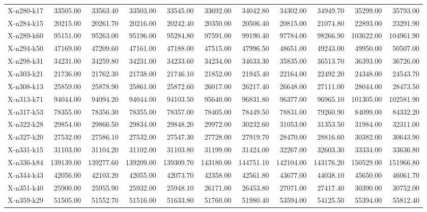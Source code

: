 \documentclass[letterpaper]{article} %
\begin{document}
\begin{landscape}
\begin{longtable}{@{}l rr rr rr rr rr@{}}
X-n280-k17 & 33505.00 & 33563.40 & 33503.00 & 33545.00 & 33692.00 & 34042.80 & 34302.00 & 34949.70 & 35299.00 & 35793.00 \\
X-n284-k15 & 20215.00 & 20261.70 & 20216.00 & 20242.40 & 20350.00 & 20506.40 & 20815.00 & 21074.80 & 22893.00 & 23291.90 \\
X-n289-k60 & 95151.00 & 95263.00 & 95196.00 & 95284.80 & 97591.00 & 99190.40 & 97784.00 & 98266.90 & 103622.00 & 104961.90 \\
X-n294-k50 & 47169.00 & 47209.60 & 47161.00 & 47188.00 & 47515.00 & 47996.50 & 48651.00 & 49243.00 & 49950.00 & 50507.00 \\
X-n298-k31 & 34231.00 & 34259.80 & 34231.00 & 34233.60 & 34234.00 & 34633.30 & 35835.00 & 36513.70 & 36393.00 & 36726.00 \\
X-n303-k21 & 21736.00 & 21762.30 & 21738.00 & 21746.10 & 21852.00 & 21945.40 & 22164.00 & 22492.20 & 24348.00 & 24543.70 \\
X-n308-k13 & 25859.00 & 25878.90 & 25861.00 & 25872.60 & 26017.00 & 26217.40 & 26648.00 & 27111.00 & 28044.00 & 28473.50 \\
X-n313-k71 & 94044.00 & 94094.20 & 94044.00 & 94103.50 & 95640.00 & 96831.80 & 96377.00 & 96965.10 & 101305.00 & 102581.90 \\
X-n317-k53 & 78355.00 & 78356.30 & 78355.00 & 78357.00 & 78405.00 & 78449.50 & 78831.00 & 79260.90 & 84099.00 & 84332.20 \\
X-n322-k28 & 29854.00 & 29866.50 & 29834.00 & 29848.20 & 29972.00 & 30232.60 & 31053.00 & 31353.50 & 31984.00 & 32311.00 \\
X-n327-k20 & 27532.00 & 27586.10 & 27532.00 & 27547.30 & 27728.00 & 27919.70 & 28470.00 & 28816.60 & 30382.00 & 30643.90 \\
X-n331-k15 & 31103.00 & 31104.20 & 31102.00 & 31103.80 & 31199.00 & 31424.00 & 32267.00 & 32603.30 & 33334.00 & 33636.80 \\
X-n336-k84 & 139139.00 & 139277.60 & 139209.00 & 139309.70 & 143180.00 & 144751.10 & 142104.00 & 143176.20 & 150529.00 & 151966.80 \\
X-n344-k43 & 42056.00 & 42103.20 & 42055.00 & 42073.70 & 42358.00 & 42561.80 & 43677.00 & 44038.10 & 45650.00 & 46061.70 \\
X-n351-k40 & 25900.00 & 25955.90 & 25932.00 & 25948.10 & 26171.00 & 26453.80 & 27071.00 & 27417.40 & 30390.00 & 30752.00 \\
X-n359-k29 & 51505.00 & 51552.70 & 51516.00 & 51633.80 & 51760.00 & 51980.40 & 53594.00 & 54125.50 & 55394.00 & 55812.40 \\

\end{longtable}
\end{landscape}
\end{document}
